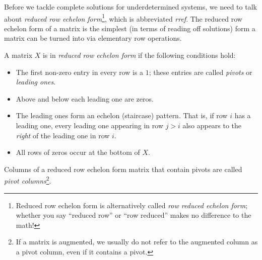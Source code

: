 	Before we tackle complete solutions for underdetermined systems, we need to talk about \emph{reduced row echelon form}\footnote{
		Reduced row echelon form is alternatively called \emph{row reduced echelon form}; whether you say ``reduced row'' or 
		``row reduced'' makes no difference to the math!
	},
	which is abbreviated \emph{rref}.
	The reduced row echelon form of a matrix is the
	simplest (in terms of reading off solutions) form a matrix can be turned into via elementary row operations.

	\begin{definition}
		A matrix $X$ is in \emph{reduced row echelon form} if the following conditions hold:
		\smallskip
		\begin{itemize}
			\item The first non-zero entry in every row is a $1$; these entries are called \emph{pivots}
				or \emph{leading ones}.
			\item Above and below each leading one are zeros.
			\item The leading ones form an echelon (staircase) pattern. That is, if row $i$ has a leading
				one, every leading one appearing in row $j>i$ also appears to the {\it right} of
				the leading one in row $i$.
			\item All rows of zeros occur at the bottom of $X$.
		\end{itemize}
		\smallskip

		Columns of a reduced row echelon form matrix that contain pivots are called \emph{pivot columns}\footnote{
			If a matrix is augmented, we usually do not refer to the augmented column as a pivot column, even
			if it contains a pivot.
		}.
	\end{definition}

